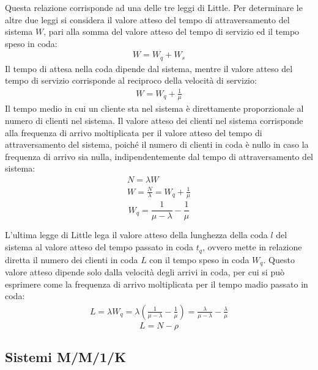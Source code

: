\documentclass{article}
\numberwithin{equation}{subsection}
\begin{document}
Questa relazione corrisponde ad una delle tre leggi di Little. 
Per determinare le altre due leggi si considera il valore atteso del tempo di attraversamento del sistema $W$, pari alla somma del valore atteso del tempo di 
servizio ed il tempo speso in coda:
\begin{gather}
    W=W_q+W_s
\end{gather}
Il tempo di attesa nella coda dipende dal sistema, mentre il valore atteso del tempo di servizio corrisponde al reciproco della velocità di servizio:
\begin{gather*}
    W=W_q+\displaystyle\frac{1}{\mu}
\end{gather*}
Il tempo medio in cui un cliente sta nel sistema è direttamente proporzionale al numero di clienti nel sistema. Il valore atteso dei clienti nel sistema corrisponde alla 
frequenza di arrivo moltiplicata per il valore atteso del tempo di attraversamento del sistema, poiché il numero di clienti in coda è nullo in caso la frequenza di arrivo 
sia nulla, indipendentemente dal tempo di attraversamento del sistema:
\begin{gather*}
    N=\lambda W\\
    W =\displaystyle\frac{N}{\lambda}=W_q+\frac{1}{\mu}
\end{gather*}
\begin{equation}
    W_q=\displaystyle\frac{1}{\mu-\lambda}-\frac{1}{\mu}
\end{equation}

L'ultima legge di Little lega il valore atteso della lunghezza della coda $l$ del sistema al valore atteso del tempo passato in coda $t_q$, ovvero mette in relazione diretta il numero 
dei clienti in coda $L$ con il tempo speso in coda $W_q$. Questo valore atteso dipende solo dalla velocità degli arrivi in coda, per cui si può esprimere come la frequenza di 
arrivo moltiplicata per il tempo madio passato in coda:
\begin{gather*}
    L=\lambda W_q=\lambda\left(\displaystyle\frac{1}{\mu-\lambda}-\frac{1}{\mu}\right)=\frac{\lambda}{\mu-\lambda}-\frac{\lambda}{\mu}
\end{gather*}
\begin{equation}
    L=N-\rho
\end{equation}

\subsection{Sistemi M/M/1/K}
\end{document}
